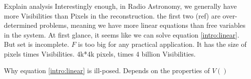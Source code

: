 Explain analysis
Interestingly enough, in Radio Astronomy, we generally have more Visibilities than Pixels in the reconstruction. the first two (ref) are over-determined problems, meaning we have more linear equations than free variables in the system.
At first glance, it seems like we can solve equation \eqref{intro:linear}.
But set is incomplete.
$F$ is too big for any practical application. It has the size of pixels times Visibilities. 4k*4k pixels, times 4 billion Visibilities.

Why equation \eqref{intro:linear} is ill-posed. Depends on the properties of $V()$

\begin{figure}[htp]
	\sbox{}
	\setlength{\twosubht}{\ht\twosubbox}
	

\end{figure}
